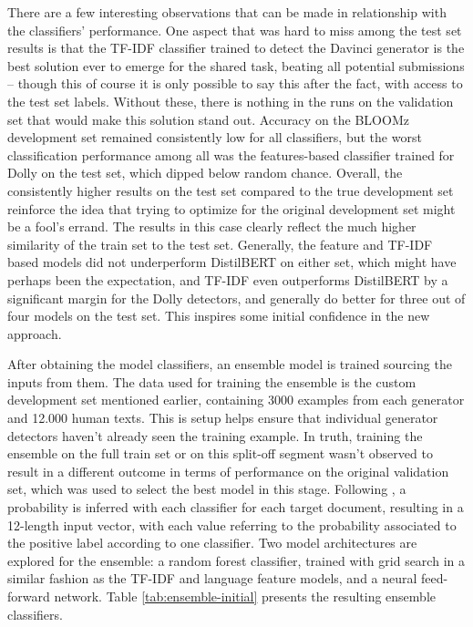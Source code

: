 There are a few interesting observations that can be made in relationship with the classifiers' performance.
One aspect that was hard to miss among the test set results is that the TF-IDF classifier trained to detect the Davinci generator is the best solution ever to emerge for the shared task, beating all potential submissions -- though this of course it is only possible to say this after the fact, with access to the test set labels.
Without these, there is nothing in the runs on the validation set that would make this solution stand out.
Accuracy on the BLOOMz development set remained consistently low for all classifiers, but the worst classification performance among all was the features-based classifier trained for Dolly on the test set, which dipped below random chance.
Overall, the consistently higher results on the test set compared to the true development set reinforce the idea that trying to optimize for the original development set might be a fool's errand.
The results in this case clearly reflect the much higher similarity of the train set to the test set.
Generally, the feature and TF-IDF based models did not underperform DistilBERT on either set, which might have perhaps been the expectation, and TF-IDF even outperforms DistilBERT by a significant margin for the Dolly detectors, and generally do better for three out of four models on the test set.
This inspires some initial confidence in the new approach.

After obtaining the model classifiers, an ensemble model is trained sourcing the inputs from them.
The data used for training the ensemble is the custom development set mentioned earlier, containing 3000 examples from each generator and 12.000 human texts.
This is setup helps ensure that individual generator detectors haven't already seen the training example.
In truth, training the ensemble on the full train set or on this split-off segment wasn't observed to result in a different outcome in terms of performance on the original validation set, which was used to select the best model in this stage.
Following \citet{frohling2021feature}, a probability is inferred with each classifier for each target document, resulting in a 12-length input vector, with each value referring to the probability associated to the positive label according to one classifier.
Two model architectures are explored for the ensemble: a random forest classifier, trained with grid search in a similar fashion as the TF-IDF and language feature models, and a neural feed-forward network.
Table \ref{tab:ensemble-initial} presents the resulting ensemble classifiers.

